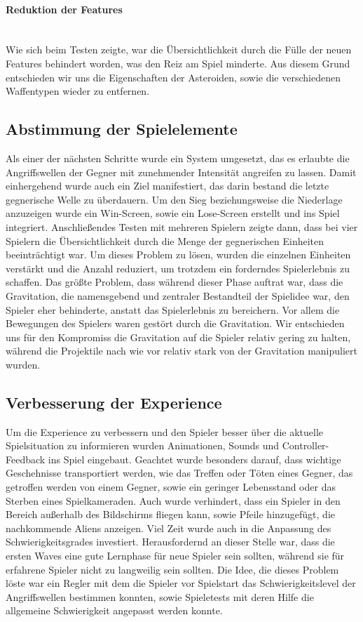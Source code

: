 \documentclass[11pt]{scrartcl}
\newcommand{\lbparagraph}[1]{\paragraph*{#1}\mbox{}\\}
\begin{document}
\lbparagraph{Reduktion der Features}
Wie sich beim Testen zeigte, war die Übersichtlichkeit durch die Fülle der neuen Features behindert worden, was den Reiz am Spiel minderte. Aus diesem Grund entschieden wir uns die Eigenschaften der Asteroiden, sowie die verschiedenen Waffentypen wieder zu entfernen.

\subsection{Abstimmung der Spielelemente}
Als einer der nächsten Schritte wurde ein System umgesetzt, das es erlaubte die Angriffswellen der Gegner mit zunehmender Intensität angreifen zu lassen. Damit einhergehend wurde auch ein Ziel manifestiert, das darin bestand die letzte gegnerische Welle zu überdauern. Um den Sieg beziehungsweise die Niederlage anzuzeigen wurde ein Win-Screen, sowie ein Lose-Screen erstellt und ins Spiel integriert.
Anschließendes Testen mit mehreren Spielern zeigte dann, dass bei vier Spielern die Übersichtlichkeit durch die Menge der gegnerischen Einheiten beeinträchtigt war. Um dieses Problem zu lösen, wurden die einzelnen Einheiten verstärkt und die Anzahl reduziert, um trotzdem ein forderndes Spielerlebnis zu schaffen.
Das größte Problem, dass während dieser Phase auftrat war, dass die Gravitation, die namensgebend und zentraler Bestandteil der Spielidee war, den Spieler eher behinderte, anstatt das Spielerlebnis zu bereichern. Vor allem die Bewegungen des Spielers waren gestört durch die Gravitation. Wir entschieden uns für den Kompromiss die Gravitation auf die Spieler relativ gering zu halten, während die Projektile nach wie vor relativ stark von der Gravitation manipuliert wurden.

\subsection{Verbesserung der Experience}
Um die Experience zu verbessern und den Spieler besser über die aktuelle Spielsituation zu informieren wurden Animationen, Sounds und Controller-Feedback ins Spiel eingebaut. Geachtet wurde besonders darauf, dass wichtige Geschehnisse transportiert werden, wie das Treffen oder Töten eines Gegner, das getroffen werden von einem Gegner, sowie ein geringer Lebensstand oder das Sterben eines Spielkameraden. Auch wurde verhindert, dass ein Spieler in den Bereich außerhalb des Bildschirms fliegen kann, sowie Pfeile hinzugefügt, die nachkommende Aliens anzeigen.
Viel Zeit wurde auch in die Anpassung des Schwierigkeitsgrades investiert. Herausfordernd an dieser Stelle war, dass die ersten Waves eine gute Lernphase für neue Spieler sein sollten, während sie für erfahrene Spieler nicht zu langweilig sein sollten. Die Idee, die dieses Problem löste war ein Regler mit dem die Spieler vor Spielstart das Schwierigkeitslevel der Angriffswellen bestimmen konnten, sowie Spieletests mit deren Hilfe die allgemeine Schwierigkeit angepasst werden konnte.
\end{document}

